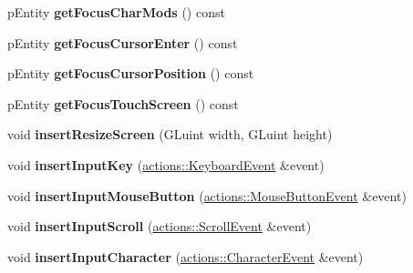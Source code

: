 \begin{DoxyCompactItemize}
\item 
\hypertarget{classfillwave_1_1Engine_a328004b38586dbd571230b666098e701}{}p\+Entity {\bfseries get\+Focus\+Char\+Mods} () const \label{classfillwave_1_1Engine_a328004b38586dbd571230b666098e701}

\item 
\hypertarget{classfillwave_1_1Engine_a42fb9efb98c8c4be2cca3de94bd86a3e}{}p\+Entity {\bfseries get\+Focus\+Cursor\+Enter} () const \label{classfillwave_1_1Engine_a42fb9efb98c8c4be2cca3de94bd86a3e}

\item 
\hypertarget{classfillwave_1_1Engine_adb0369bdcbfe6e6dad399c1978f86d87}{}p\+Entity {\bfseries get\+Focus\+Cursor\+Position} () const \label{classfillwave_1_1Engine_adb0369bdcbfe6e6dad399c1978f86d87}

\item 
\hypertarget{classfillwave_1_1Engine_a333f8f38b26b8b7720b720fc9cedf24e}{}p\+Entity {\bfseries get\+Focus\+Touch\+Screen} () const \label{classfillwave_1_1Engine_a333f8f38b26b8b7720b720fc9cedf24e}

\item 
\hypertarget{classfillwave_1_1Engine_ab5a508e59472b0653897b4c69ec09a63}{}void {\bfseries insert\+Resize\+Screen} (G\+Luint width, G\+Luint height)\label{classfillwave_1_1Engine_ab5a508e59472b0653897b4c69ec09a63}

\item 
\hypertarget{classfillwave_1_1Engine_aa5e13d284305180bf20d10305d8872b5}{}void {\bfseries insert\+Input\+Key} (\hyperlink{classfillwave_1_1actions_1_1KeyboardEvent}{actions\+::\+Keyboard\+Event} \&event)\label{classfillwave_1_1Engine_aa5e13d284305180bf20d10305d8872b5}

\item 
\hypertarget{classfillwave_1_1Engine_af5ffe1f7302ea8a702ca1b5bacbee3f0}{}void {\bfseries insert\+Input\+Mouse\+Button} (\hyperlink{classfillwave_1_1actions_1_1MouseButtonEvent}{actions\+::\+Mouse\+Button\+Event} \&event)\label{classfillwave_1_1Engine_af5ffe1f7302ea8a702ca1b5bacbee3f0}

\item 
\hypertarget{classfillwave_1_1Engine_abc1d359828cf055ef09abeac5f5b39b1}{}void {\bfseries insert\+Input\+Scroll} (\hyperlink{classfillwave_1_1actions_1_1ScrollEvent}{actions\+::\+Scroll\+Event} \&event)\label{classfillwave_1_1Engine_abc1d359828cf055ef09abeac5f5b39b1}

\item 
\hypertarget{classfillwave_1_1Engine_ace0064c0b6223910e6924fa0df32c6ac}{}void {\bfseries insert\+Input\+Character} (\hyperlink{classfillwave_1_1actions_1_1CharacterEvent}{actions\+::\+Character\+Event} \&event)\label{classfillwave_1_1Engine_ace0064c0b6223910e6924fa0df32c6ac}


\end{DoxyCompactItemize}
